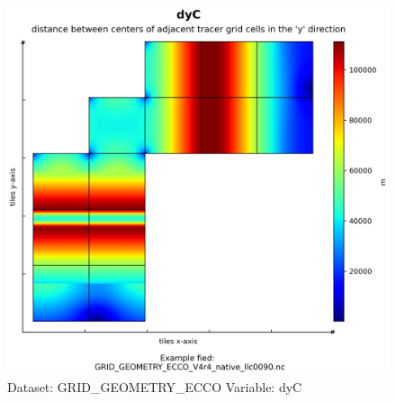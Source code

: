 \begin{figure}[H]
\centering
\includegraphics[width=\textwidth]{../images/plots/native_plots_coords/Geometry_Parameters_for_the_Lat-Lon-Cap_90_(llc90)_Native_Model_Grid_(Version_4_Release_4)/dyC.png}
\caption{Dataset: GRID\_GEOMETRY\_ECCO Variable: dyC}
\label{tab:table-GRID_GEOMETRY_ECCO_dyC-Plot}
\end{figure}
\pagebreak
